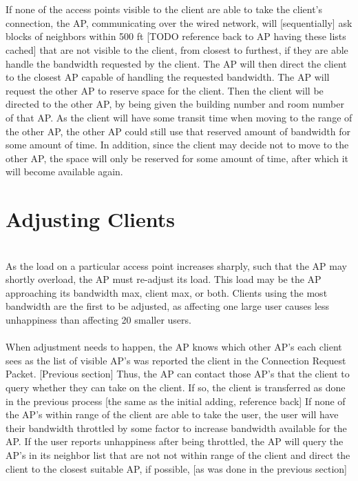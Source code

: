 \documentclass{article}
\begin{document}
\\
\\
\indent
If none of the access points visible to the client are able to take the client's connection, the AP, communicating over the wired network, will [sequentially] ask blocks of neighbors within 500 ft [TODO reference back to AP having these lists cached] that are not visible to the client, from closest to furthest, if they are able handle the bandwidth requested by the client. The AP will then direct the client to the closest AP capable of handling the requested bandwidth. The AP will request the other AP to reserve space for the client. Then the client will be directed to the other AP, by being given the building number and room number of that AP. As the client will have some transit time when moving to the range of the other AP, the other AP could still use that reserved amount of bandwidth for some amount of time. In addition, since the client may decide not to move to the other AP, the space will only be reserved for some amount of time, after which it will become available again.

\section{Adjusting Clients}
\\
\indent
As the load on a particular access point increases sharply, such that the AP may shortly overload, the AP must re-adjust its load. This load may be the AP approaching its bandwidth max, client max, or both. Clients using the most bandwidth are the first to be adjusted, as affecting one large user causes less unhappiness than affecting 20 smaller users. 
\\
\\
\indent
When adjustment needs to happen, the AP knows which other AP's each client sees as the list of visible AP's was reported the client in the Connection Request Packet. [Previous section] Thus, the AP can contact those AP's that the client to query whether they can take on the client. If so, the client is transferred as done in the previous process [the same as the initial adding, reference back] If none of the AP's within range of the client are able to take the user, the user will have their bandwidth throttled by some factor to increase bandwidth available for the AP. If the user reports unhappiness after being throttled, the AP will query the AP's in its neighbor list that are not not within range of the client and direct the client to the closest suitable AP, if possible, [as was done in the previous section]
\\
\\
[Extra section on moving around small bandwidth users]
\end{document}
